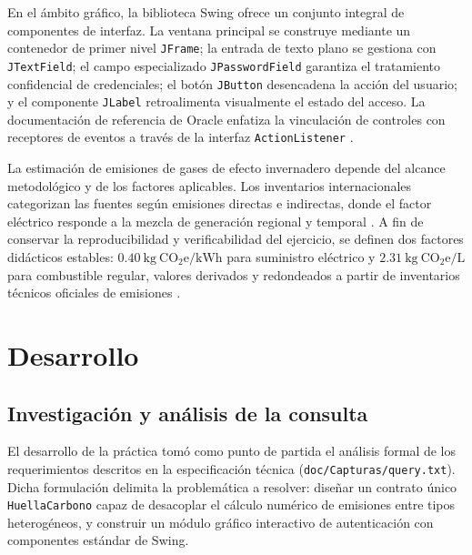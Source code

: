 \documentclass[letterpaper,12pt,oneside]{article}
\numberwithin{figure}{section}
\begin{document}
En el \'ambito gr\'afico, la biblioteca Swing ofrece un conjunto integral de componentes de interfaz. La ventana principal se construye mediante un contenedor de primer nivel \texttt{JFrame}; la entrada de texto plano se gestiona con \texttt{JTextField}; el campo especializado \texttt{JPasswordField} garantiza el tratamiento confidencial de credenciales; el bot\'on \texttt{JButton} desencadena la acci\'on del usuario; y el componente \texttt{JLabel} retroalimenta visualmente el estado del acceso. La documentaci\'on de referencia de Oracle enfatiza la vinculaci\'on de controles con receptores de eventos a trav\'es de la interfaz \texttt{ActionListener} \cite{swing}.

La estimaci\'on de emisiones de gases de efecto invernadero depende del alcance metodol\'ogico y de los factores aplicables. Los inventarios internacionales categorizan las fuentes seg\'un emisiones directas e indirectas, donde el factor el\'ectrico responde a la mezcla de generaci\'on regional y temporal \cite{epaelectric}. A fin de conservar la reproducibilidad y verificabilidad del ejercicio, se definen dos factores did\'acticos estables: $0.40\ \mathrm{kg\ CO_2e/kWh}$ para suministro el\'ectrico y $2.31\ \mathrm{kg\ CO_2e/L}$ para combustible regular, valores derivados y redondeados a partir de inventarios t\'ecnicos oficiales de emisiones \cite{epafactors}.

\clearpage
\section{Desarrollo}

\subsection{Investigaci\'on y an\'alisis de la consulta}
El desarrollo de la pr\'actica tom\'o como punto de partida el an\'alisis formal de los requerimientos descritos en la especificaci\'on t\'ecnica (\texttt{doc/Capturas/query.txt}). Dicha formulaci\'on delimita la problem\'atica a resolver: dise\~nar un contrato \'unico \texttt{HuellaCarbono} capaz de desacoplar el c\'alculo num\'erico de emisiones entre tipos heterog\'eneos, y construir un m\'odulo gr\'afico interactivo de autenticaci\'on con componentes est\'andar de Swing.
\end{document}
